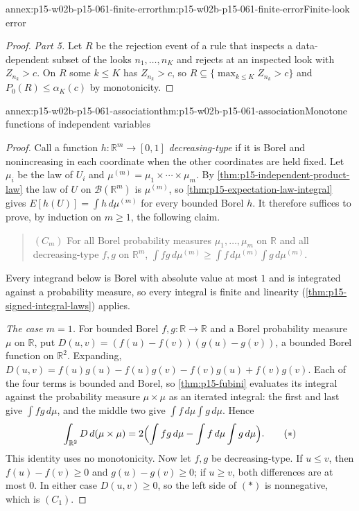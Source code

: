 \begin{annexitem}{annex:p15-w02b-p15-061-finite-error}{thm:p15-w02b-p15-061-finite-error}{Finite-look error}
\begin{proof}
\emph{Part 5.} Let \(R\) be the rejection event of a rule that inspects
a data-dependent subset of the looks \(n_1,\ldots,n_K\) and rejects at an
inspected look with \(Z_{n_k}>c\). On \(R\) some \(k\leq K\) has
\(Z_{n_k}>c\), so \(R\subseteq\{\max_{k\leq K}Z_{n_k}>c\}\) and
\(P_0(R)\leq\alpha_K(c)\) by monotonicity.
\end{proof}
\end{annexitem}

\begin{annexitem}{annex:p15-w02b-p15-061-association}{thm:p15-w02b-p15-061-association}{Monotone functions of independent variables}
\begin{proof}
Call a function \(h\colon\mathbb R^m\to[0,1]\) \emph{decreasing-type} if
it is Borel and nonincreasing in each coordinate when the other
coordinates are held fixed. Let \(\mu_i\) be the law of \(U_i\) and
\(\mu^{(m)}=\mu_1\times\cdots\times\mu_m\). By
\cref{thm:p15-independent-product-law} the law of \(U\) on
\(\mathcal B(\mathbb R^m)\) is \(\mu^{(m)}\), so
\cref{thm:p15-expectation-law-integral} gives
\(E[h(U)]=\int h\,d\mu^{(m)}\) for every bounded Borel \(h\). It
therefore suffices to prove, by induction on \(m\geq1\), the following
claim.
\begin{quote}
\((C_m)\) For all Borel probability measures \(\mu_1,\ldots,\mu_m\) on
\(\mathbb R\) and all decreasing-type \(f,g\) on \(\mathbb R^m\),
\(\int fg\,d\mu^{(m)}\geq\int f\,d\mu^{(m)}\int g\,d\mu^{(m)}\).
\end{quote}
Every integrand below is Borel with absolute value at most \(1\) and is
integrated against a probability measure, so every integral is finite and
linearity (\cref{thm:p15-signed-integral-laws}) applies.

\emph{The case \(m=1\).} For bounded Borel \(f,g\colon\mathbb R\to\mathbb R\)
and a Borel probability measure \(\mu\) on \(\mathbb R\), put
\(D(u,v)=(f(u)-f(v))(g(u)-g(v))\), a bounded Borel function on
\(\mathbb R^2\). Expanding,
\(D(u,v)=f(u)g(u)-f(u)g(v)-f(v)g(u)+f(v)g(v)\). Each of the four terms
is bounded and Borel, so \cref{thm:p15-fubini} evaluates its integral
against the probability measure \(\mu\times\mu\) as an iterated integral:
the first and last give \(\int fg\,d\mu\), and the middle two give
\(\int f\,d\mu\int g\,d\mu\). Hence
\[
 \int_{\mathbb R^2}D\,d(\mu\times\mu)
 =2\Bigl(\int fg\,d\mu-\int f\,d\mu\int g\,d\mu\Bigr).
 \tag{\(\ast\)}
\]
This identity uses no monotonicity. Now let \(f,g\) be decreasing-type.
If \(u\leq v\), then \(f(u)-f(v)\geq0\) and \(g(u)-g(v)\geq0\); if
\(u\geq v\), both differences are at most \(0\). In either case
\(D(u,v)\geq0\), so the left side of
\((\ast)\) is nonnegative, which is
\((C_1)\).


\end{proof}
\end{annexitem}
